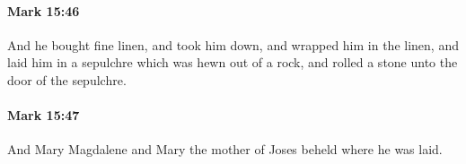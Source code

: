 		\paragraph{Mark 15:46} %
			\label{MARK-15-46}

			And he bought fine linen, and took him down, and wrapped him in the linen, and laid him in a sepulchre which was hewn out of a rock, and rolled a stone unto the door of the sepulchre.

			\begin{framed}
			\scriptsize
				\begin{compactdesc}
					\item[SBLG] 
				\end{compactdesc}
			\end{framed}

		\paragraph{Mark 15:47} %
			\label{MARK-15-47}

			And Mary Magdalene and Mary the mother of Joses beheld where he was laid.

